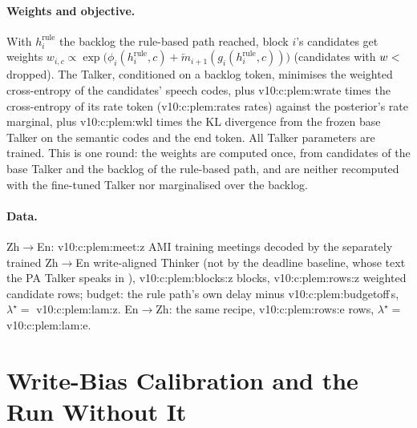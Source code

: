 \paragraph{Weights and objective.} With $h_i^{\mathrm{rule}}$ the backlog the rule-based path reached, block $i$'s
candidates get weights $w_{i,c}\propto\exp\big(\phi_i(h_i^{\mathrm{rule}},c)+\overleftarrow{m}_{i+1}(g_i(h_i^{\mathrm{rule}},c))\big)$
(candidates with $w<\num{v10:c:plem:minq}$ dropped). The Talker, conditioned on a backlog token, minimises the weighted
cross-entropy of the candidates' speech codes, plus \num{v10:c:plem:wrate} times the cross-entropy of its rate token
(\num{v10:c:plem:rates} rates) against the posterior's rate marginal, plus \num{v10:c:plem:wkl} times the KL divergence
from the frozen base Talker on the semantic codes and the end token. All Talker parameters are trained. This is one
round: the weights are computed once, from candidates of the base Talker and the backlog of the rule-based path, and are
neither recomputed with the fine-tuned Talker nor marginalised over the backlog.

\paragraph{Data.} Zh$\rightarrow$En: \num{v10:c:plem:meet:z} AMI training meetings decoded by the separately trained
Zh$\rightarrow$En write-aligned Thinker (not by the deadline baseline, whose text the PA Talker speaks in \sys{}), \num{v10:c:plem:blocks:z} blocks, \num{v10:c:plem:rows:z} weighted candidate rows;
budget: the rule path's own delay minus \num{v10:c:plem:budgetoff}\,s, $\lambda^\star=$ \num{v10:c:plem:lam:z}.
En$\rightarrow$Zh: the same recipe, \num{v10:c:plem:rows:e} rows, $\lambda^\star=$ \num{v10:c:plem:lam:e}.



\section{Write-Bias Calibration and the Run Without It}
\label{app:calib}

